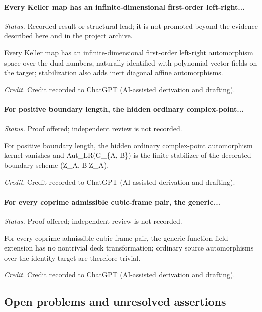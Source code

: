 \label{supp-note-01-034}
\paragraph{Every Keller map has an infinite-dimensional first-order left-right...}
\emph{Status.} Recorded result or structural lead; it is not promoted beyond the evidence described here and in the project archive.

Every Keller map has an infinite-dimensional first-order left-right automorphism space over the dual numbers, naturally identified with polynomial vector fields on the target; stabilization also adds inert diagonal affine automorphisms.

\emph{Credit.} Credit recorded to ChatGPT (AI-assisted derivation and drafting).

\label{supp-note-01-035}
\paragraph{For positive boundary length, the hidden ordinary complex-point...}
\emph{Status.} Proof offered; independent review is not recorded.

For positive boundary length, the hidden ordinary complex-point automorphism kernel vanishes and Aut\_LR(G\_\{A, B\}) is the finite stabilizer of the decorated boundary scheme (Z\_A, B|Z\_A).

\emph{Credit.} Credit recorded to ChatGPT (AI-assisted derivation and drafting).

\label{supp-note-01-036}
\paragraph{For every coprime admissible cubic-frame pair, the generic...}
\emph{Status.} Proof offered; independent review is not recorded.

For every coprime admissible cubic-frame pair, the generic function-field extension has no nontrivial deck transformation; ordinary source automorphisms over the identity target are therefore trivial.

\emph{Credit.} Credit recorded to ChatGPT (AI-assisted derivation and drafting).

\subsection{Open problems and unresolved assertions}

